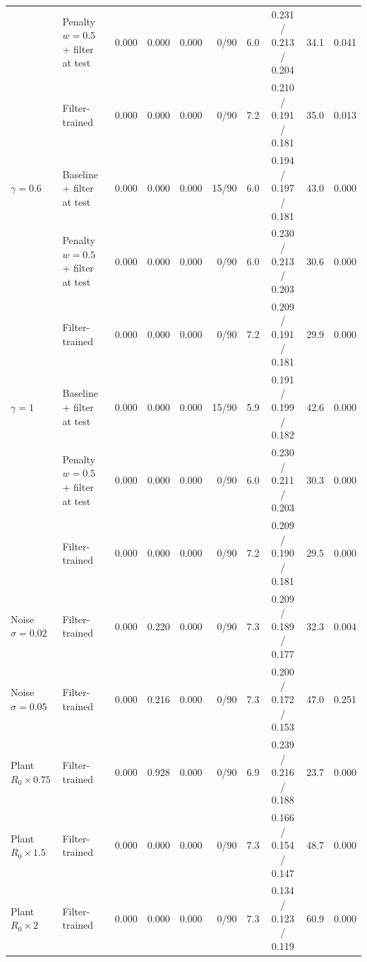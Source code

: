{\begin{tabular}{llrrrrrcrr}
 & Penalty $w=0.5$ + filter at test & 0.000 & 0.000 & 0.000 & 0/90 & 6.0 & 0.231 / 0.213 / 0.204 & 34.1 & 0.041 \\
 & Filter-trained & 0.000 & 0.000 & 0.000 & 0/90 & 7.2 & 0.210 / 0.191 / 0.181 & 35.0 & 0.013 \\
\addlinespace
$\gamma=0.6$ & Baseline + filter at test & 0.000 & 0.000 & 0.000 & 15/90 & 6.0 & 0.194 / 0.197 / 0.181 & 43.0 & 0.000 \\
 & Penalty $w=0.5$ + filter at test & 0.000 & 0.000 & 0.000 & 0/90 & 6.0 & 0.230 / 0.213 / 0.203 & 30.6 & 0.000 \\
 & Filter-trained & 0.000 & 0.000 & 0.000 & 0/90 & 7.2 & 0.209 / 0.191 / 0.181 & 29.9 & 0.000 \\
\addlinespace
$\gamma=1$ & Baseline + filter at test & 0.000 & 0.000 & 0.000 & 15/90 & 5.9 & 0.191 / 0.199 / 0.182 & 42.6 & 0.000 \\
 & Penalty $w=0.5$ + filter at test & 0.000 & 0.000 & 0.000 & 0/90 & 6.0 & 0.230 / 0.211 / 0.203 & 30.3 & 0.000 \\
 & Filter-trained & 0.000 & 0.000 & 0.000 & 0/90 & 7.2 & 0.209 / 0.190 / 0.181 & 29.5 & 0.000 \\
\midrule
Noise $\sigma=0.02$ & Filter-trained & 0.000 & 0.220 & 0.000 & 0/90 & 7.3 & 0.209 / 0.189 / 0.177 & 32.3 & 0.004 \\
\addlinespace
Noise $\sigma=0.05$ & Filter-trained & 0.000 & 0.216 & 0.000 & 0/90 & 7.3 & 0.200 / 0.172 / 0.153 & 47.0 & 0.251 \\
\addlinespace
Plant $R_0\times0.75$ & Filter-trained & 0.000 & 0.928 & 0.000 & 0/90 & 6.9 & 0.239 / 0.216 / 0.188 & 23.7 & 0.000 \\
\addlinespace
Plant $R_0\times1.5$ & Filter-trained & 0.000 & 0.000 & 0.000 & 0/90 & 7.3 & 0.166 / 0.154 / 0.147 & 48.7 & 0.000 \\
\addlinespace
Plant $R_0\times2$ & Filter-trained & 0.000 & 0.000 & 0.000 & 0/90 & 7.3 & 0.134 / 0.123 / 0.119 & 60.9 & 0.000 \\
\bottomrule\end{tabular}}
